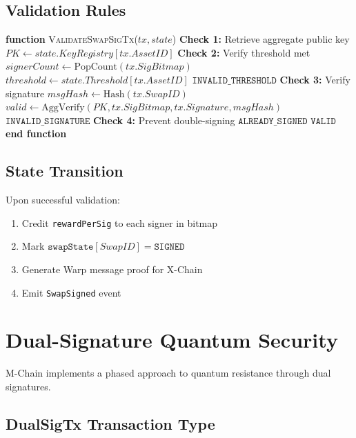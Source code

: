 \documentclass[11pt]{article}
\begin{document}
\subsection{Validation Rules}



\begin{algorithmic}[1]
\State \textbf{function} \textsc{ValidateSwapSigTx}($tx, state$)
    \State \textbf{Check 1:} Retrieve aggregate public key
    \State $PK \gets state.KeyRegistry[tx.AssetID]$
    \State
    \State \textbf{Check 2:} Verify threshold met
    \State $signerCount \gets \text{PopCount}(tx.SigBitmap)$
    \State $threshold \gets state.Threshold[tx.AssetID]$
        \State \Return $\texttt{INVALID\_THRESHOLD}$
    \EndIf
    \State
    \State \textbf{Check 3:} Verify signature
    \State $msgHash \gets \text{Hash}(tx.SwapID)$
    \State $valid \gets \text{AggVerify}(PK, tx.SigBitmap, tx.Signature, msgHash)$
        \State \Return $\texttt{INVALID\_SIGNATURE}$
    \EndIf
    \State
    \State \textbf{Check 4:} Prevent double-signing
        \State \Return $\texttt{ALREADY\_SIGNED}$
    \EndIf
    \State
    \State \Return $\texttt{VALID}$
\State \textbf{end function}
\end{algorithmic}


\subsection{State Transition}

Upon successful validation:
\begin{enumerate}
\item Credit \texttt{rewardPerSig} to each signer in bitmap
\item Mark $\texttt{swapState}[SwapID] = \texttt{SIGNED}$
\item Generate Warp message proof for X-Chain
\item Emit \texttt{SwapSigned} event
\end{enumerate}

\section{Dual-Signature Quantum Security}

M-Chain implements a phased approach to quantum resistance through dual signatures.

\subsection{DualSigTx Transaction Type}
\end{document}
